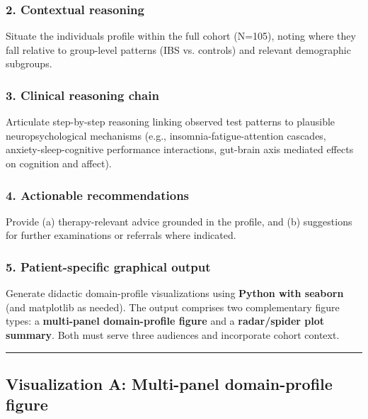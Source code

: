 \subsubsection{2. Contextual reasoning}\label{2-contextual-reasoning}

Situate the individual\textquotesingle s profile within the full cohort
(N=105), noting where they fall relative to group-level patterns (IBS
vs. controls) and relevant demographic subgroups.

\subsubsection{3. Clinical reasoning
chain}\label{3-clinical-reasoning-chain}

Articulate step-by-step reasoning linking observed test patterns to
plausible neuropsychological mechanisms (e.g.,
insomnia-fatigue-attention cascades, anxiety-sleep-cognitive performance
interactions, gut-brain axis mediated effects on cognition and affect).

\subsubsection{4. Actionable
recommendations}\label{4-actionable-recommendations}

Provide (a) therapy-relevant advice grounded in the profile, and (b)
suggestions for further examinations or referrals where indicated.

\subsubsection{5. Patient-specific graphical
output}\label{5-patient-specific-graphical-output}

Generate didactic domain-profile visualizations using \textbf{Python
with seaborn} (and matplotlib as needed). The output comprises two
complementary figure types: a \textbf{multi-panel domain-profile figure}
and a \textbf{radar/spider plot summary}. Both must serve three
audiences and incorporate cohort context.

\begin{center}\rule{0.5\linewidth}{0.5pt}\end{center}

\subsection{Visualization A: Multi-panel domain-profile
figure}\label{visualization-a-multi-panel-domain-profile-figure}

